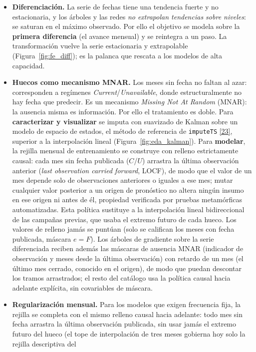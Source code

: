 \documentclass[12pt,letterpaper]{report}
\newcommand{\cita}[1]{\hyperref[bib:#1]{[#1]}}
\begin{document}
\begin{itemize}[leftmargin=*]
\item \textbf{Diferenciación.} La serie de fechas tiene una tendencia fuerte y no
estacionaria, y los árboles y las redes \textit{no extrapolan tendencias sobre niveles}: se
saturan en el máximo observado. Por ello el objetivo se modela sobre la \textbf{primera
diferencia} (el avance mensual) y se reintegra a un paso. La transformación vuelve la serie
estacionaria y extrapolable (Figura~\ref{fig:fe_diff}); es la palanca que rescata a los
modelos de alta capacidad.
\item \textbf{Huecos como mecanismo MNAR.} Los meses sin fecha no faltan al azar:
corresponden a regímenes \textit{Current}/\textit{Unavailable}, donde estructuralmente
no hay fecha que predecir. Es un mecanismo \textit{Missing Not At Random} (MNAR): la
ausencia misma es información. Por ello el tratamiento es doble. Para
\textbf{caracterizar y visualizar} se imputa con suavizado de Kalman sobre un modelo de
espacio de estados, el método de referencia de \texttt{imputeTS} \cita{23}, superior a
la interpolación lineal (Figura~\ref{fig:eda_kalman}). Para \textbf{modelar}, la
rejilla mensual de entrenamiento se construye con relleno estrictamente causal: cada
mes sin fecha publicada ($C$/$U$) arrastra la última observación anterior
(\textit{last observation carried forward}, LOCF), de modo que el valor de un mes
depende solo de observaciones anteriores o iguales a ese mes; mutar cualquier valor
posterior a un origen de pronóstico no altera ningún insumo en ese origen ni antes de
él, propiedad verificada por pruebas metamórficas automatizadas. Esta política
sustituye a la interpolación lineal bidireccional de las campañas previas, que usaba
el extremo futuro de cada hueco. Los valores de relleno jamás se puntúan (solo se
califican los meses con fecha publicada, máscara $e=F$). Los árboles de gradiente
sobre la serie diferenciada reciben además las máscaras de ausencia MNAR (indicador
de observación y meses desde la última observación) con retardo de un mes (el último
mes cerrado, conocido en el origen), de modo que puedan descontar los tramos
arrastrados; el resto del catálogo usa la política causal hacia adelante explícita,
sin covariables de máscara.
\item \textbf{Regularización mensual.} Para los modelos que exigen frecuencia fija, la
rejilla se completa con el mismo relleno causal hacia adelante: todo mes sin fecha
arrastra la última observación publicada, sin usar jamás el extremo futuro del hueco
(el tope de interpolación de tres meses gobierna hoy solo la rejilla descriptiva del

\end{itemize}
\end{document}

